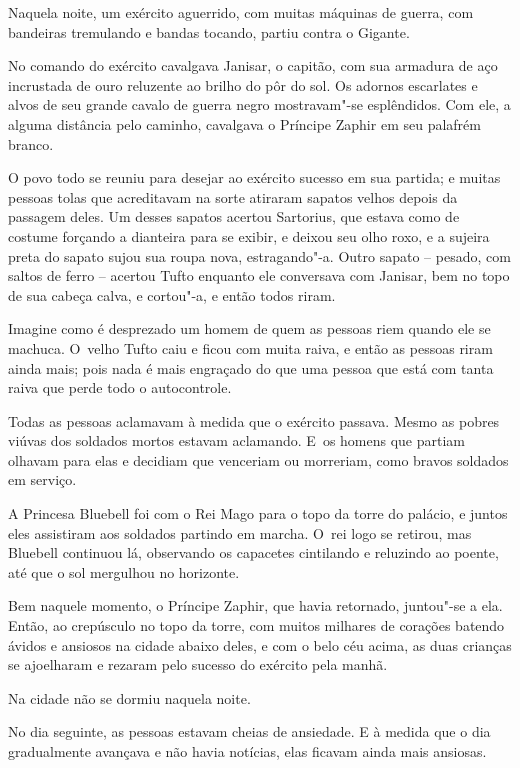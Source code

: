 Naquela noite, um exército aguerrido, com muitas máquinas de guerra, com
bandeiras tremulando e bandas tocando, partiu contra o Gigante.

No comando do exército cavalgava Janisar, o capitão, com sua armadura de
aço incrustada de ouro reluzente ao brilho do pôr do sol. Os adornos
escarlates e alvos de seu grande cavalo de guerra negro mostravam"-se
esplêndidos. Com ele, a alguma distância pelo caminho, cavalgava o
Príncipe Zaphir em seu palafrém branco.

O povo todo se reuniu para desejar ao exército sucesso em sua partida; e
muitas pessoas tolas que acreditavam na sorte atiraram sapatos velhos
depois da passagem deles. Um desses sapatos acertou Sartorius, que
estava como de costume forçando a dianteira para se exibir, e deixou seu
olho roxo, e a sujeira preta do sapato sujou sua roupa nova,
estragando"-a. Outro sapato -- pesado, com saltos de ferro -- acertou
Tufto enquanto ele conversava com Janisar, bem no topo de sua cabeça
calva, e cortou"-a, e então todos riram.

Imagine como é desprezado um homem de quem as pessoas riem quando ele se
machuca. O~velho Tufto caiu e ficou com muita raiva, e então as pessoas
riram ainda mais; pois nada é mais engraçado do que uma pessoa que está
com tanta raiva que perde todo o autocontrole.

Todas as pessoas aclamavam à medida que o exército passava. Mesmo as
pobres viúvas dos soldados mortos estavam aclamando. E~os homens que
partiam olhavam para elas e decidiam que venceriam ou morreriam, como
bravos soldados em serviço.

A Princesa Bluebell foi com o Rei Mago para o topo da torre do palácio,
e juntos eles assistiram aos soldados partindo em marcha. O~rei logo se
retirou, mas Bluebell continuou lá, observando os capacetes cintilando e
reluzindo ao poente, até que o sol mergulhou no horizonte.

Bem naquele momento, o Príncipe Zaphir, que havia retornado, juntou"-se a
ela. Então, ao crepúsculo no topo da torre, com muitos milhares de
corações batendo ávidos e ansiosos na cidade abaixo deles, e com o belo
céu acima, as duas crianças se ajoelharam e rezaram pelo sucesso do
exército pela manhã.

\smallskip
Na cidade não se dormiu naquela noite.

\smallskip
No dia seguinte, as pessoas estavam cheias de ansiedade. E à medida que
o dia gradualmente avançava e não havia notícias, elas ficavam ainda
mais ansiosas.

